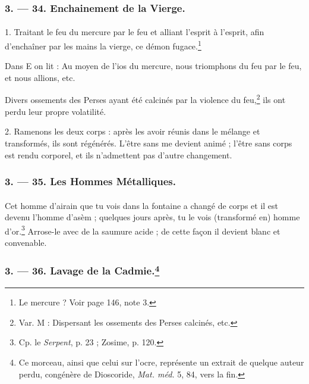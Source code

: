 \documentclass[a4paper, 11pt, oneside, polutonikogreek, french]{article}
\begin{document}
\bigskip
\centerline{\EightStarTaper}
\centerline{\EightStarTaper\EightStarTaper}
\bigskip

\subsubsection{3. --- 34. Enchainement de la Vierge.}
\paragraph{}
1. Traitant le feu du mercure par le feu et alliant l'esprit à l'esprit, afin d'enchaîner par les mains la vierge, ce démon fugace.\footnote{Le mercure ? Voir page 146, note 3.  }

Dans E on lit : Au moyen de l'ios du mercure, nous triomphons du feu par le feu, et nous allions, etc.

Divers ossements des Perses ayant été calcinés par la violence du feu,\footnote{Var. M : Dispersant les ossements des Perses calcinés, etc.} ils ont perdu leur propre volatilité.

2. Ramenons les deux corps : après les avoir réunis dans le mélange et transformés, ils sont régénérés. L'être sans me devient animé ; l'être sans corps est rendu corporel, et ils n'admettent pas d'autre changement.

\bigskip
\centerline{\EightStarTaper}
\centerline{\EightStarTaper\EightStarTaper}
\bigskip

\subsubsection{3. --- 35. Les Hommes Métalliques.}
\paragraph{}
Cet homme d'airain que tu vois dans la fontaine a changé de corps et il est devenu l'homme d'asèm ; quelques jours après, tu le vois (transformé en) homme d'or.\footnote{Cp. le \emph{Serpent}, p. 23 ; Zosime, p. 120.} Arrose-le avec de la saumure acide ; de cette façon il devient blanc et convenable.

\bigskip
\centerline{\EightStarTaper}
\centerline{\EightStarTaper\EightStarTaper}
\bigskip

\subsubsection[3. --- 36. Lavage de la Cadmie.]{3. --- 36. Lavage de la Cadmie.\footnote{Ce morceau, ainsi que celui sur l'ocre, représente un extrait de quelque auteur perdu, congénère de Dioscoride, \emph{Mat. méd.} 5, 84, vers la fin.}}
\end{document}
